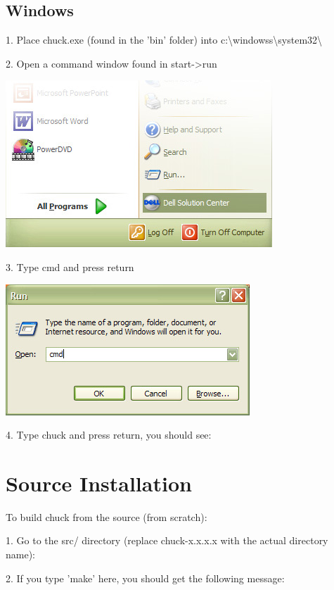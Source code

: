 \subsection{Windows}

1. Place chuck.exe (found in the 'bin' folder) into c:\textbackslash windowss\textbackslash system32\textbackslash

2. Open a command window found in start-\textgreater run

\includegraphics{images/startmenu}

3. Type cmd and press return

\includegraphics{images/cmd}

4. Type chuck and press return, you should see:


\section{Source Installation}

To build chuck from the source (from scratch): 

1. Go to the src/ directory (replace chuck-x.x.x.x with the actual 
directory name):



2. If you type 'make' here, you should get the following message:

